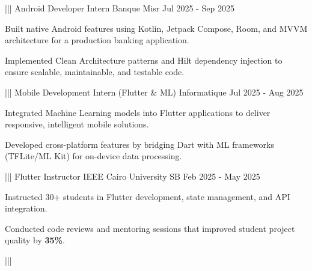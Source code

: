 {{    }%
    |||
    {Android Developer Intern}%
    {Banque Misr}%
    {Jul 2025 - Sep 2025}%
    {%
        \item Built native Android features using Kotlin, Jetpack Compose, Room, and MVVM architecture for a production banking application.
        \item Implemented Clean Architecture patterns and Hilt dependency injection to ensure scalable, maintainable, and testable code.
    }%
    |||
    {Mobile Development Intern (Flutter \& ML)}%
    {Informatique}%
    {Jul 2025 - Aug 2025}%
    {%
        \item Integrated Machine Learning models into Flutter applications to deliver responsive, intelligent mobile solutions.
        \item Developed cross-platform features by bridging Dart with ML frameworks (TFLite/ML Kit) for on-device data processing.
    }%
    |||
    {Flutter Instructor}%
    {IEEE Cairo University SB}%
    {Feb 2025 - May 2025}%
    {%
        \item Instructed 30+ students in Flutter development, state management, and API integration.
        \item Conducted code reviews and mentoring sessions that improved student project quality by \textbf{35\%}.
    }%
    |||%
}


